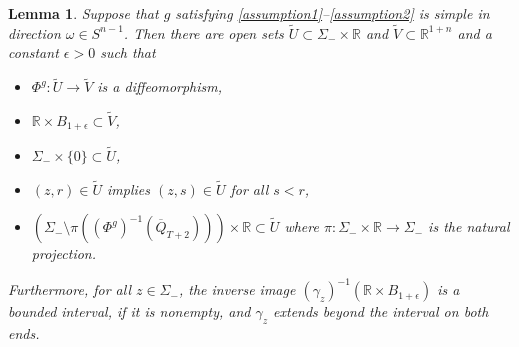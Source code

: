 \documentclass[11pt,letterpaper]{amsart}
\newtheorem{Lemma}[Theorem]{Lemma}
\theoremstyle{definition}
\numberwithin{equation}{section}
\newcommand{\ol}[1]{\overline{#1}}
\def\R{\mathbb R}
\begin{document}
\begin{Lemma}\label{lem_simple_ext}
Suppose that $g$ satisfying \eqref{assumption1}--\eqref{assumption2} is simple in direction $\omega \in S^{n-1}$. Then
there are open sets $\tilde U \subset \Sigma_- \times \R$ and $\tilde V \subset \R^{1+n}$ and a constant $\epsilon > 0$ such that 
\begin{itemize}
\item[(i)] $\Phi^g : \tilde U \to \tilde V$ is a diffeomorphism,
\item[(ii)] $\R \times B_{1+\epsilon} \subset \tilde V$,
\item[(iii)] $\Sigma_- \times \{0\} \subset \tilde U$,
\item[(iv)] $(z, r) \in \tilde U$ implies $(z,s) \in \tilde U$ for all $s < r$,
\item[(v)] $(\Sigma_- \setminus \pi((\Phi^g)^{-1}(\ol Q_{T+2}))) \times \R \subset \tilde U$ where $\pi : \Sigma_- \times \R \to \Sigma_-$ is the natural projection.
\end{itemize}
Furthermore, for all $z \in \Sigma_-$, the inverse image $(\gamma_z)^{-1}(\R \times B_{1+\epsilon})$ is a bounded interval, if it is nonempty, and $\gamma_z$ extends beyond the interval on both ends. 
\end{Lemma}
\end{document}
